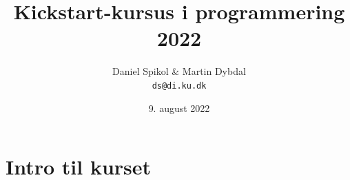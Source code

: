 \documentclass[10pt]{beamer}
\title[Kickstart-kursus] %
  {Kickstart-kursus i programmering 2022} %
\author{\footnotesize{Daniel Spikol \& Martin Dybdal} \\
          \footnotesize{\texttt{ds@di.ku.dk}}}
\institute {
DIKU \\ Københavns Universitet
}
\date[9. august 2022]{9. august 2022}
\begin{document}
\begin{frame}[plain]
\titlepage
\end{frame}








\section{Intro til kurset}


\end{document}
